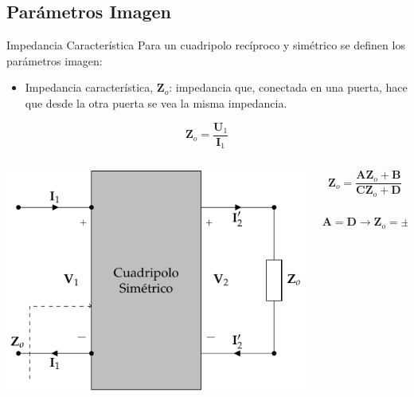 \documentclass[xcolor={usenames,svgnames,dvipsnames}]{beamer}
\begin{document}
\subsection{Parámetros Imagen}
\label{sec:org5f4e5de}

\begin{frame}[label={sec:org49d5911}]{Impedancia Característica}
Para un cuadripolo \alert{recíproco} y \alert{simétrico} se definen los parámetros imagen:

\begin{itemize}
\item \alert{Impedancia característica}, \(\mathbf{Z}_o\): impedancia que, conectada en una puerta, hace que desde la otra puerta se vea la misma impedancia.
\end{itemize}
\[
  \mathbf{Z}_o = \frac{\mathbf{U}_1}{\mathbf{I}_1}
\]

\begin{columns}
\begin{column}{0.7\columnwidth}
\begin{center}
\includegraphics[width=.9\linewidth]{../figs/cuadripolo_impedancia_caracteristica.pdf}
\end{center}
\end{column}

\begin{column}{0.4\columnwidth}
\[
\mathbf{Z}_o = \frac{\mathbf{A} \mathbf{Z}_o + \mathbf{B}}{\mathbf{C}\mathbf{Z}_o + \mathbf{D}}
\]

\[
\mathbf{A} = \mathbf{D} \rightarrow \boxed{\mathbf{Z}_o = \pm \sqrt{\frac{\mathbf{B}}{\mathbf{C}}}}
\]
\end{column}
\end{columns}
\end{frame}
\end{document}
